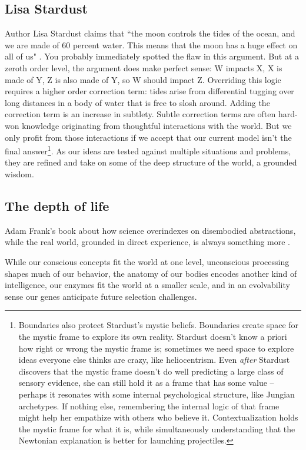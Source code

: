\subsection{Lisa Stardust}

Author Lisa Stardust claims that ``the moon controls the tides of the ocean, and we are made of 60 percent water. This means that the moon has a huge effect on all of us" \citep{mitchell2021moonwater}. You probably immediately spotted the flaw in this argument. But at a zeroth order level, the argument does make perfect sense: W impacts X, X is made of Y, Z is also made of Y, so W should impact Z. Overriding this logic requires a higher order correction term: tides arise from differential tugging over long distances in a body of water that is free to slosh around. Adding the correction term is an increase in subtlety. Subtle correction terms are often hard-won knowledge originating from thoughtful interactions with the world. But we only profit from those interactions if we accept that our current model isn't the final answer\footnote{Boundaries also protect Stardust's mystic beliefs. Boundaries create space for the mystic frame to explore its own reality. Stardust doesn't know a priori how right or wrong the mystic frame is; sometimes we need space to explore ideas everyone else thinks are crazy, like heliocentrism. Even \textit{after} Stardust discovers that the mystic frame doesn't do well predicting a large class of sensory evidence, she can still hold it as a frame that has some value -- perhaps it resonates with some internal psychological structure, like Jungian archetypes. If nothing else, remembering the internal logic of that frame might help her empathize with others who believe it. Contextualization holds the mystic frame for what it is, while simultaneously understanding that the Newtonian explanation is better for launching projectiles.}. As our ideas are tested against multiple situations and problems, they are refined and take on some of the deep structure of the world, a grounded wisdom.

\subsection{The depth of life}


Adam Frank's book about how science overindexes on disembodied abstractions, while the real world, grounded in direct experience, is always something more \citep{frank2023blind}.


While our conscious concepts fit the world at one level, unconscious processing shapes much of our behavior, the anatomy of our bodies encodes another kind of intelligence, our enzymes fit the world at a smaller scale, and in an evolvability sense our genes anticipate future selection challenges.

